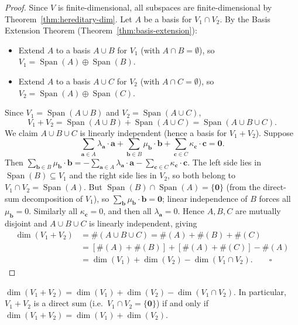 \documentclass[11pt, a4paper, notitlepage]{report}
\theoremstyle{definition}
\theoremstyle{remark}
\begin{document}
\begin{proof}
Since $V$ is finite-dimensional, all subspaces are finite-dimensional by Theorem~\ref{thm:hereditary-dim}. Let $A$ be a basis for $V_1\cap V_2$. By the Basis Extension Theorem (Theorem~\ref{thm:basis-extension}):
\begin{itemize}
  \item Extend $A$ to a basis $A\cup B$ for $V_1$ (with $A\cap B = \emptyset$), so $V_1 = \operatorname{Span}(A)\oplus\operatorname{Span}(B)$.
  \item Extend $A$ to a basis $A\cup C$ for $V_2$ (with $A\cap C = \emptyset$), so $V_2 = \operatorname{Span}(A)\oplus\operatorname{Span}(C)$.
\end{itemize}

Since $V_1 = \operatorname{Span}(A\cup B)$ and $V_2 = \operatorname{Span}(A\cup C)$,
\[
  V_1 + V_2 = \operatorname{Span}(A\cup B) + \operatorname{Span}(A\cup C) = \operatorname{Span}(A\cup B\cup C).
\]
We claim $A\cup B\cup C$ is linearly independent (hence a basis for $V_1+V_2$). Suppose
\[
  \sum_{\mathbf{a}\in A}\lambda_\mathbf{a}\cdot\mathbf{a} + \sum_{\mathbf{b}\in B}\mu_\mathbf{b}\cdot\mathbf{b} + \sum_{\mathbf{c}\in C}\kappa_\mathbf{c}\cdot\mathbf{c} = \mathbf{0}.
\]
Then $\sum_{\mathbf{b}\in B}\mu_\mathbf{b}\cdot\mathbf{b} = -\sum_{\mathbf{a}\in A}\lambda_\mathbf{a}\cdot\mathbf{a} - \sum_{\mathbf{c}\in C}\kappa_\mathbf{c}\cdot\mathbf{c}$. The left side lies in $\operatorname{Span}(B)\subseteq V_1$ and the right side lies in $V_2$, so both belong to $V_1\cap V_2 = \operatorname{Span}(A)$. But $\operatorname{Span}(B)\cap\operatorname{Span}(A) = \{\mathbf{0}\}$ (from the direct-sum decomposition of $V_1$), so $\sum_{\mathbf{b}}\mu_\mathbf{b}\cdot\mathbf{b} = \mathbf{0}$; linear independence of $B$ forces all $\mu_\mathbf{b}=0$. Similarly all $\kappa_\mathbf{c}=0$, and then all $\lambda_\mathbf{a}=0$. Hence $A,B,C$ are mutually disjoint and $A\cup B\cup C$ is linearly independent, giving
\begin{align*}
  \dim(V_1+V_2) &= \#(A\cup B\cup C) = \#(A)+\#(B)+\#(C) \\
                &= [\#(A)+\#(B)] + [\#(A)+\#(C)] - \#(A) \\
                &= \dim(V_1) + \dim(V_2) - \dim(V_1\cap V_2). \qquad\square
\end{align*}
\end{proof}

\begin{keyresult}[title={Key Result: Dimension Formula for Subspace Sums}]
$\dim(V_1+V_2) = \dim(V_1)+\dim(V_2)-\dim(V_1\cap V_2)$. In particular, $V_1+V_2$ is a direct sum (i.e.\ $V_1\cap V_2 = \{\mathbf{0}\}$) if and only if $\dim(V_1+V_2)=\dim(V_1)+\dim(V_2)$.
\end{keyresult}
\end{document}

